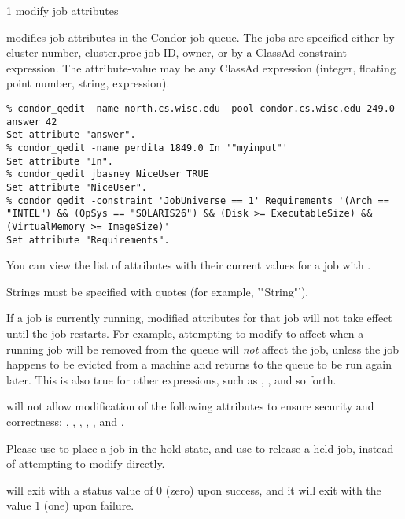 \begin{ManPage}{\label{man-condor-qedit}}{1}
{modify job attributes}
\Synopsis {}
\Arg{\Dots}


\Description

 modifies job attributes in the Condor job queue.  The
jobs are specified either by cluster number, cluster.proc job ID,
owner, or by a ClassAd constraint expression.  The attribute-value may
be any ClassAd expression (integer, floating point number, string,
expression).

\begin{Options}
\end{Options}

\Examples
\begin{verbatim}
% condor_qedit -name north.cs.wisc.edu -pool condor.cs.wisc.edu 249.0 answer 42
Set attribute "answer".
% condor_qedit -name perdita 1849.0 In '"myinput"'
Set attribute "In".
% condor_qedit jbasney NiceUser TRUE
Set attribute "NiceUser".
% condor_qedit -constraint 'JobUniverse == 1' Requirements '(Arch == "INTEL") && (OpSys == "SOLARIS26") && (Disk >= ExecutableSize) && (VirtualMemory >= ImageSize)'
Set attribute "Requirements".
\end{verbatim}

\GenRem
You can view the list of attributes with their current values for a
job with  .

Strings must be specified with quotes (for example, '"String"').

If a job is currently running, modified attributes for that job will not 
take effect until the job restarts.
For example, attempting to modify 
 to affect when a running job will be
removed from the queue 
will \emph{not} affect the job, unless the job happens to be 
evicted from a machine and returns to the queue to be run again later.
This is also true for other expressions, such as ,
, and so forth.

 will not allow modification of the following
attributes to ensure security and correctness: ,
, , , , and
.

Please use  to place a job in the hold state,
and use  to release a held job,
instead of attempting to modify  directly.

\ExitStatus

 will exit with a status value of 0 (zero) upon success,
and it will exit with the value 1 (one) upon failure.

\end{ManPage}

